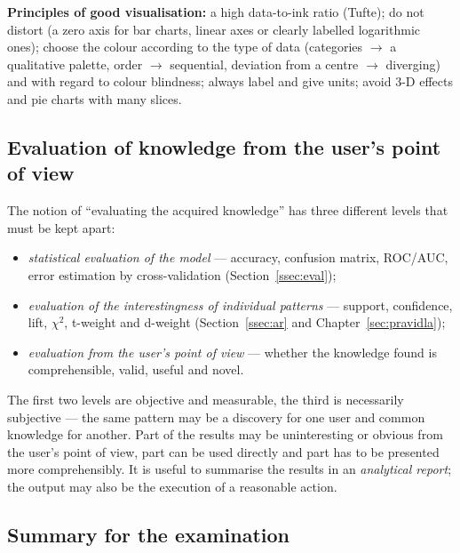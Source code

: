 \documentclass[11pt,a4paper]{article}
\theoremstyle{definition}
\providecommand{\uv}[1]{``#1''}
\begin{document}
\textbf{Principles of good visualisation:} a high data-to-ink ratio (Tufte); do not distort (a zero
axis for bar charts, linear axes or clearly labelled logarithmic ones); choose the colour according
to the type of data (categories $\to$ a qualitative palette, order $\to$ sequential, deviation from
a centre $\to$ diverging) and with regard to colour blindness; always label and give units; avoid
3-D effects and pie charts with many slices.

\subsection{Evaluation of knowledge from the user's point of view}

The notion of \uv{evaluating the acquired knowledge} has three different levels that must be kept
apart:
\begin{itemize}
\item \emph{statistical evaluation of the model} --- accuracy, confusion matrix, ROC/AUC, error
      estimation by cross-validation (Section~\ref{ssec:eval});
\item \emph{evaluation of the interestingness of individual patterns} --- support, confidence, lift,
      $\chi^2$, t-weight and d-weight (Section~\ref{ssec:ar} and Chapter~\ref{sec:pravidla});
\item \emph{evaluation from the user's point of view} --- whether the knowledge found is
      comprehensible, valid, useful and novel.
\end{itemize}
The first two levels are objective and measurable, the third is necessarily subjective --- the same
pattern may be a discovery for one user and common knowledge for another. Part of the results may be
uninteresting or obvious from the user's point of view, part can be used directly and part has to be
presented more comprehensibly. It is useful to summarise the results in an \emph{analytical
report}; the output may also be the execution of a reasonable action.

\subsection{Summary for the examination}
\end{document}
